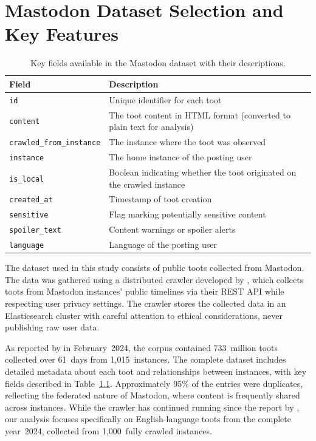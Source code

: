 \chapter{Mastodon Dataset Selection and Key Features} \label{dataset-description}

\begin{table}[tb]
    \centering\small
    \renewcommand{\arraystretch}{1.3}
    \begin{tabularx}{\textwidth}{lX}
        \toprule
        \textbf{Field} & \textbf{Description} \\
        \midrule
        \texttt{id} & Unique identifier for each toot \\
        \texttt{content} & The toot content in HTML format (converted to plain text for analysis) \\
        \texttt{crawled\_from\_instance} & The instance where the toot was observed \\
        \texttt{instance} & The home instance of the posting user \\
        \texttt{is\_local} & Boolean indicating whether the toot originated on the crawled instance \\
        \texttt{created\_at} & Timestamp of toot creation \\
        \texttt{sensitive} & Flag marking potentially sensitive content \\
        \texttt{spoiler\_text} & Content warnings or spoiler alerts \\
        \texttt{language} & Language of the posting user \\
        \bottomrule
    \end{tabularx}
    \caption{Key fields available in the Mastodon dataset with their descriptions.}
    \label{dataset-fields}
\end{table}

The dataset used in this study consists of public toots collected from Mastodon. The data was gathered using a distributed crawler developed by \citet{wiegmann:2024}, which collects toots from Mastodon instances' public timelines via their REST API while respecting user privacy settings. The crawler stores the collected data in an Elasticsearch cluster with careful attention to ethical considerations, never publishing raw user data.

As reported by \citet{wiegmann:2024} in February~2024, the corpus contained 733~million toots collected over 61~days from 1,015~instances. The complete dataset includes detailed metadata about each toot and relationships between instances, with key fields described in Table~\ref{dataset-fields}. Approximately 95\% of the entries were duplicates, reflecting the federated nature of Mastodon, where content is frequently shared across instances. While the crawler has continued running since the report by \citet{wiegmann:2024}, our analysis focuses specifically on English-language toots from the complete year~2024, collected from 1,000~fully crawled instances.

